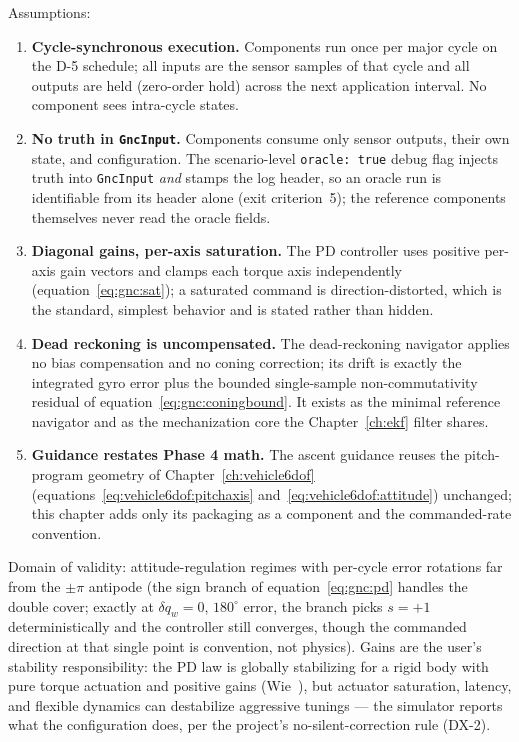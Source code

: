 Assumptions:
\begin{enumerate}
  \item \textbf{Cycle-synchronous execution.} Components run once per
    major cycle on the D-5 schedule; all inputs are the sensor samples
    of that cycle and all outputs are held (zero-order hold) across the
    next application interval. No component sees intra-cycle states.
  \item \textbf{No truth in \texttt{GncInput}.} Components consume only
    sensor outputs, their own state, and configuration. The
    scenario-level \texttt{oracle: true} debug flag injects truth into
    \texttt{GncInput} \emph{and} stamps the log header, so an oracle
    run is identifiable from its header alone (exit criterion~5); the
    reference components themselves never read the oracle fields.
  \item \textbf{Diagonal gains, per-axis saturation.} The PD controller
    uses positive per-axis gain vectors and clamps each torque axis
    independently (equation~\eqref{eq:gnc:sat}); a saturated command is
    direction-distorted, which is the standard, simplest behavior and
    is stated rather than hidden.
  \item \textbf{Dead reckoning is uncompensated.} The dead-reckoning
    navigator applies no bias compensation and no coning correction;
    its drift is exactly the integrated gyro error plus the bounded
    single-sample non-commutativity residual of
    equation~\eqref{eq:gnc:coningbound}. It exists as the minimal
    reference navigator and as the mechanization core the
    Chapter~\ref{ch:ekf} filter shares.
  \item \textbf{Guidance restates Phase 4 math.} The ascent guidance
    reuses the pitch-program geometry of Chapter~\ref{ch:vehicle6dof}
    (equations~\eqref{eq:vehicle6dof:pitchaxis}
    and~\eqref{eq:vehicle6dof:attitude}) unchanged; this chapter adds
    only its packaging as a component and the commanded-rate
    convention.
\end{enumerate}

Domain of validity: attitude-regulation regimes with per-cycle error
rotations far from the $\pm\pi$ antipode (the sign branch of
equation~\eqref{eq:gnc:pd} handles the double cover; exactly at
$\delta q_w = 0$, $180^{\circ}$ error, the branch picks $s = +1$
deterministically and the controller still converges, though the
commanded direction at that single point is convention, not physics).
Gains are the user's stability responsibility: the PD law is globally
stabilizing for a rigid body with pure torque actuation and positive
gains (Wie~\cite{wie2008}), but actuator saturation, latency, and
flexible dynamics can destabilize aggressive tunings --- the simulator
reports what the configuration does, per the project's
no-silent-correction rule (DX-2).

